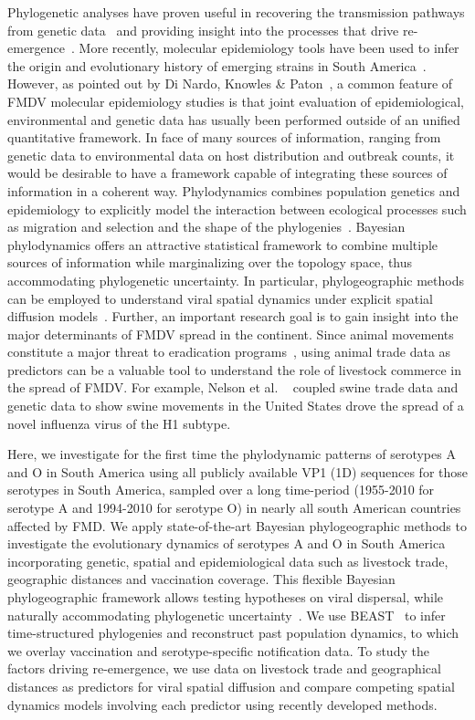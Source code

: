 \documentclass[10pt]{article}
\begin{document}
Phylogenetic analyses have proven useful in recovering the transmission pathways from genetic data~\cite{cottam2007, cottam2008} and providing insight into the processes that drive re-emergence~\cite{combining}.
More recently, molecular epidemiology tools have been used to infer the origin and evolutionary history of emerging strains in South America~\cite{Perez2001, Malirat2007, andean, Malirat2011, Maradei2013}.
However, as pointed out by Di Nardo, Knowles \& Paton~\cite{combining}, a common feature of FMDV molecular epidemiology studies is that  joint evaluation of epidemiological, environmental and genetic data has usually been performed outside of an unified quantitative framework.
In face of many sources of information, ranging from genetic data to environmental data on host distribution and outbreak counts, it would be desirable to have a framework capable of integrating these sources of information in a coherent way.
Phylodynamics combines population genetics and epidemiology to explicitly  model the interaction between ecological processes such as migration and selection and the shape of the phylogenies~\cite{grenfell, vphylodynamics}.
Bayesian phylodynamics offers an attractive statistical framework to combine multiple sources of information while marginalizing over the topology space, thus accommodating phylogenetic uncertainty.
In particular, phylogeographic methods can be employed to understand viral spatial dynamics under explicit spatial diffusion models~\cite{roots}.
Further, an important research goal is to gain insight into the major determinants of FMDV spread in the continent.
Since animal movements constitute a major threat to eradication programs~\cite{movements}, using animal trade data as predictors can be a valuable tool to understand the role of livestock commerce in the spread of FMDV.
For example, Nelson et al. ~\cite{Nelson2011} coupled swine trade data and genetic data to show swine movements in the United States drove the spread of a novel influenza virus of the H1 subtype.

Here, we investigate for the first time the phylodynamic patterns of serotypes A and O in South America using all publicly available VP1 (1D) sequences for those serotypes in South America, sampled over a long time-period (1955-2010 for serotype A and 1994-2010 for serotype O) in nearly all south American countries affected by FMD.
We apply state-of-the-art Bayesian phylogeographic methods to investigate the evolutionary dynamics of serotypes A and O in South America incorporating  genetic, spatial and epidemiological data such as livestock trade, geographic distances and vaccination coverage.
This flexible Bayesian phylogeographic framework allows testing hypotheses on viral dispersal, while naturally accommodating phylogenetic uncertainty~\cite{roots, towards}.
We use BEAST~\cite{beast2012} to infer time-structured phylogenies and reconstruct past population dynamics, to which we overlay vaccination and serotype-specific notification data.
To study the factors driving re-emergence, we use data on livestock trade and geographical distances as predictors for viral spatial diffusion and compare competing spatial dynamics models involving each predictor using recently developed methods. 
\end{document}
